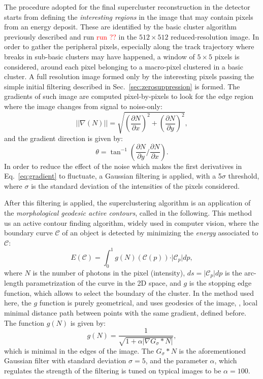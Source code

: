 The procedure adopted for the final supercluster reconstruction in the
\lemon detector starts from defining the \textit{interesting regions}
in the image that may contain pixels from an energy deposit. These are
identified by the basic cluster algorithm \idbscan previously
described and run \textcolor{red}{run ??} in the $512\times512$
reduced-resolution image. In order to gather the peripheral pixels,
especially along the track trajectory where breaks in sub-basic
clusters may have happened, a window of $5\times5$ pixels is
considered, around each pixel belonging to a macro-pixel clustered in
a basic cluster. A full resolution image formed only by the
interesting pixels passing the simple initial filtering described in
Sec.~\ref{sec:zerosuppression} is formed.  The gradients of such image
are computed pixel-by-pixels to look for the edge region where the
image changes from signal to noise-only:
\begin{equation}
\label{eq:gradient}
\vert\vert\nabla(N)\vert\vert =
\sqrt{\left(\frac{\partial N}{\partial x}\right)^2
  +\left(\frac{\partial N}{\partial y}\right)^2},
\end{equation}
and the gradient direction is given by:
\begin{equation}
  \label{eq:graddir}
  \theta = \tan^{-1}\left(\frac{\partial N}{\partial y}/\frac{\partial N}{\partial x}\right).
\end{equation}
In order to reduce the effect of the noise which makes the first
derivatives in Eq.~\ref{eq:gradient} to fluctuate, a Gaussian
filtering is applied, with a 5$\sigma$ threshold, where $\sigma$ is
the standard deviation of the intensities of the pixels considered.

After this filtering is applied, the superclustering algorithm is an
application of the \textit{morphological geodesic active
  contours}\cite{gac,mgac}, called \gac in the following.  This method
us an active contour finding algorithm, widely used in computer
vision, where the boundary curve $\mathcal{C}$ of an object is
detected by minimizing the \textit{energy} associated to $\mathcal{C}$:
\begin{equation}
  \label{eq:gacenergy}
  E(\mathcal{C}) = \int_{0}^{1} g(N)(\mathcal{C}(p)) \cdot \vert\mathcal{C}_p\vert dp,
\end{equation}
where $N$ is the number of photons in the pixel (intensity), $ds=
\vert\mathcal{C}_p\vert dp$ is the arc-length parametrization of the
curve in the 2D space, and $g$ is the stopping edge function, which
allows to select the boundary of the cluster.  In the \gac method used
here, the $g$ function is purely geometrical, and uses geodesics of
the image, \ie, local minimal distance path between points with the
same gradient, defined before. The function $g(N)$ is given by:
\begin{equation}
g(N) = \frac{1}{\sqrt{1+\alpha\vert\nabla G_\sigma * N\vert}},
\end{equation}
which is minimal in the edges of the image.  The $G_\sigma * N$ is the
aforementioned Gaussian filter with standard deviation $\sigma=5$, and
the parameter $\alpha$, which regulates the strength of the filtering
is tuned on typical \lemon images to be $\alpha=100$.

